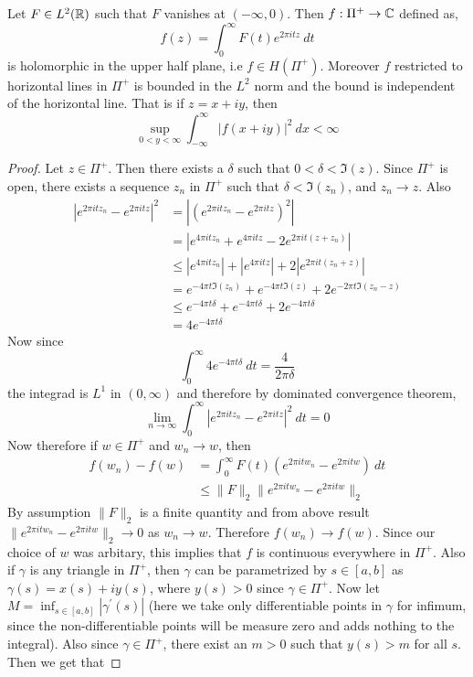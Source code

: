 \begin{proposition}
  Let $F\in L^2(\mathbb R)$ such that $F$ vanishes at $(-\infty , 0)$. Then $f : \Pi^+ \to \mathbb C$ defined as, $$f(z) = \int_0^\infty F(t) e^{2\pi itz} \ dt$$
  is holomorphic in the upper half plane, i.e $f \in H(\Pi^+)$. Moreover $f$ restricted to horizontal lines in $\Pi^+$ is bounded in the  $L^2$ norm and the bound is independent of the horizontal line. That is if $z = x+iy$, then $$\sup_{0<y<\infty}\int_{-\infty}^\infty \left|f(x + iy)\right|^2 \ dx < \infty$$
\end{proposition}
\begin{proof}
  Let $z \in \Pi^+$. Then there exists a $\delta$ such that $0< \delta < \Im(z)$. Since $\Pi^+$ is open, there exists a sequence $z_n$ in $\Pi^+$ such that $\delta < \Im(z_n)$, and  $z_n \to z$. Also 
  \begin{align*}
    \left|e^{2 \pi itz_n} - e^{2\pi itz}\right|^2 &= \left|\left(e^{2\pi it z_n} - e^{2\pi itz}\right)^2\right| \\ 
    &= \left| e^{4\pi itz_n} + e^{4\pi itz} - 2e^{2\pi it(z+z_n)} \right| \\
    &\le \left|e^{4\pi itz_n}\right| + \left|e^{4\pi itz}\right| + 2\left|e^{2\pi it(z_n + z)}\right| \\
    &= e^{-4\pi t \Im(z_n)} + e^{-4 \pi t \Im(z)} + 2e^{-2\pi t \Im(z_n - z)} \\
    &\le e^{-4\pi t \delta} + e^{-4\pi t \delta} + 2e^{-4 \pi t\delta} \\
    &=4e^{-4\pi t \delta}
  \end{align*}
  Now since $$\int_0^\infty 4e^{-4\pi t\delta} \ dt = \frac{4}{2\pi \delta}$$
  the integrad is $L^1$ in $(0, \infty)$ and therefore by dominated convergence theorem, $$\lim_{n \to \infty} \int_0^\infty \left|e^{2\pi itz_n} - e^{2\pi itz}\right|^2 \ dt = 0$$
  Now therefore if $w \in \Pi^+$ and $w_n \to w$, then 
  \begin{align*}
    f(w_n) - f(w) &= \int_0^\infty F(t)(e^{2\pi it w_n} - e^{2\pi i tw}) \ dt \\
    & \le \|F\|_2 \|e^{2\pi itw_n} - e^{2\pi itw}\|_2
  \end{align*}
  By assumption $\|F\|_2$ is a finite quantity and from above result $\|e^{2\pi itw_n} - e^{2\pi itw}\|_2 \to 0$ as $w_n \to w$. Therefore $f(w_n) \to f(w)$. Since our choice of $w$ was arbitary, this implies that $f$ is continuous everywhere in $\Pi^+$. Also if $\gamma$ is any triangle in $\Pi^+$, then $\gamma$ can be parametrized by $s \in [a, b]$ as $\gamma(s) = x(s) + iy(s)$, where $y(s) >0$ since $\gamma \in \Pi^+$. Now let $M = \inf_{s \in [a,b]} |\gamma^{'}(s)|$ (here we take only differentiable points in $\gamma$ for infimum, since the non-differentiable points will be measure zero and adds nothing to the integral). Also since $\gamma \in \Pi^+$, there exist an $m >0$ such that $y(s) > m$ for all $s$. Then we get that

\end{proof}
